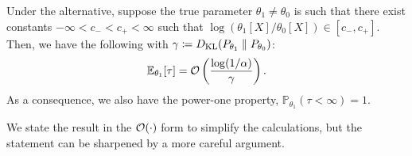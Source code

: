 \documentclass[12pt]{article}
\begin{document}
\begin{proposition}
    \label{prop:expected-stopping-time-2} 
    Under the alternative, suppose the true parameter $\theta_1 \neq \theta_0$ is such that there exist constants $-\infty < c_- <  c_+ < \infty$ such that $\log(\theta_1[X]/\theta_0[X]) \in [c_-, c_+]$.  Then, we have the following with $\gamma \coloneqq D_{\text{KL}}(P_{\theta_1} \parallel P_{\theta_0})$: 
    \begin{align}
        \mathbb{E}_{\theta_1}[\tau] = \mathcal{O}\left( \frac{\log(1/\alpha)}{\gamma} \right).     \end{align}
    As a consequence, we also have the power-one property, $\mathbb{P}_{\theta_1}(\tau < \infty) = 1$. 
\end{proposition}
We state the result in the $\mathcal{O}(\cdot)$  form to simplify the calculations, but the statement can be sharpened by a more careful argument. 
\end{document}
